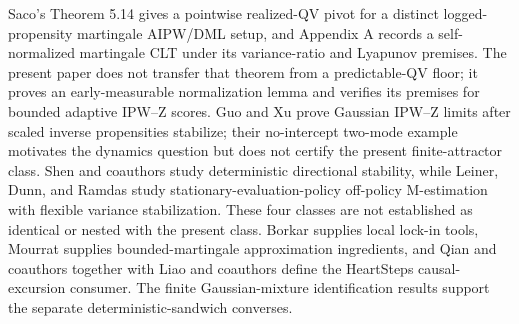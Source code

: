 Saco's Theorem 5.14 gives a pointwise realized-QV pivot for a distinct logged-propensity martingale AIPW/DML setup, and Appendix A records a self-normalized martingale CLT under its variance-ratio and Lyapunov premises. The present paper does not transfer that theorem from a predictable-QV floor; it proves an early-measurable normalization lemma and verifies its premises for bounded adaptive IPW--Z scores. Guo and Xu prove Gaussian IPW--Z limits after scaled inverse propensities stabilize; their no-intercept two-mode example motivates the dynamics question but does not certify the present finite-attractor class. Shen and coauthors study deterministic directional stability, while Leiner, Dunn, and Ramdas study stationary-evaluation-policy off-policy M-estimation with flexible variance stabilization. These four classes are not established as identical or nested with the present class. Borkar supplies local lock-in tools, Mourrat supplies bounded-martingale approximation ingredients, and Qian and coauthors together with Liao and coauthors define the HeartSteps causal-excursion consumer. The finite Gaussian-mixture identification results support the separate deterministic-sandwich converses.